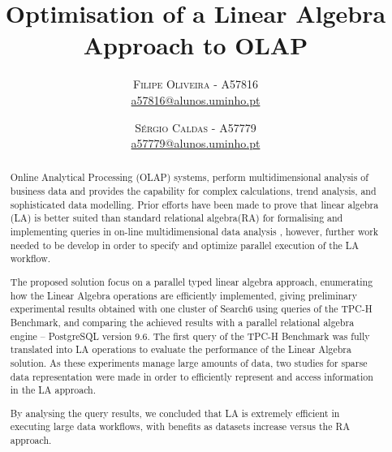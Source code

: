 \documentclass[twoside]{article}
\title{\vspace{-15mm}\fontsize{24pt}{10pt}\selectfont\textbf{Optimisation of a Linear Algebra Approach to OLAP}} %
\author{
\large
\textsc{Filipe Oliveira} - \textsc{A57816}\\
\normalsize \href{mailto:a57816@alunos.uminho.pt}{a57816@alunos.uminho.pt}
\vspace{-5mm}
\and
\textsc{Sérgio Caldas} - \textsc{A57779}\\
\normalsize \href{mailto:a57779@alunos.uminho.pt}{a57779@alunos.uminho.pt}
}
\begin{document}
\maketitle %

\thispagestyle{fancy} %


\begin{abstract}
\indent 
\par Online Analytical Processing (OLAP) systems, perform multidimensional analysis of business data and provides the capability for complex calculations, trend analysis, and sophisticated data modelling. 
Prior efforts have been made to prove that linear algebra (LA) is better suited than standard relational algebra(RA) for formalising and implementing queries in on-line multidimensional data analysis \cite{macedo2015linear} \cite{da2015benchmarking}, however, further work needed to be develop in order to specify and optimize parallel execution of the LA workflow.\par 
The proposed solution focus on a parallel typed linear algebra approach, enumerating how the Linear Algebra operations are efficiently implemented, giving preliminary experimental results obtained with one cluster of Search6 using queries of the TPC-H Benchmark, and comparing the achieved results with a parallel relational algebra engine -- PostgreSQL version 9.6. The first query of the TPC-H Benchmark was fully translated into LA operations to evaluate the performance of the Linear Algebra solution. As these experiments manage large amounts of data, two studies for sparse data representation were made in order to efficiently represent and access information in the LA approach.\par 
 By analysing the query results, we concluded that LA is extremely efficient in executing large data workflows, with benefits as datasets increase versus the RA approach.\par 
\end{abstract}
\vspace{0.5cm}
\end{document}
